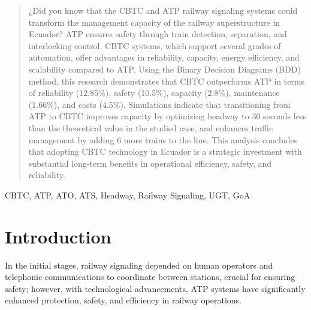 \documentclass[conference]{IEEEtran}
\begin{document}
\maketitle
\begin{abstract}
¿Did you know that the CBTC and ATP railway signaling systems could transform the management capacity of the railway superstructure in Ecuador? ATP ensures safety through train detection, separation, and interlocking control. CBTC systems, which support several grades of automation, offer advantages in reliability, capacity, energy efficiency, and scalability compared to ATP. Using the Binary Decision Diagrams (BDD) method, this research demonstrates that CBTC outperforms ATP in terms of reliability (12.85\%), safety (10.5\%), capacity (2.8\%), maintenance (1.66\%), and costs (4.5\%). Simulations indicate that transitioning from ATP to CBTC improves capacity by optimizing headway to 30 seconds less than the theoretical value in the studied case, and enhances traffic management by adding 6 more trains to the line. This analysis concludes that adopting CBTC technology in Ecuador is a strategic investment with substantial long-term benefits in operational efficiency, safety, and reliability.
\end{abstract}

\begin{IEEEkeywords}
CBTC, ATP, ATO, ATS, Headway, Railway Signaling, UGT, GoA
\end{IEEEkeywords}


\section{Introduction}
In the initial stages, railway signaling depended on human operators and telephonic communications to coordinate between stations, crucial for ensuring safety; however, with technological advancements, ATP systems have significantly enhanced protection, safety, and efficiency in railway operations.
\end{document}
